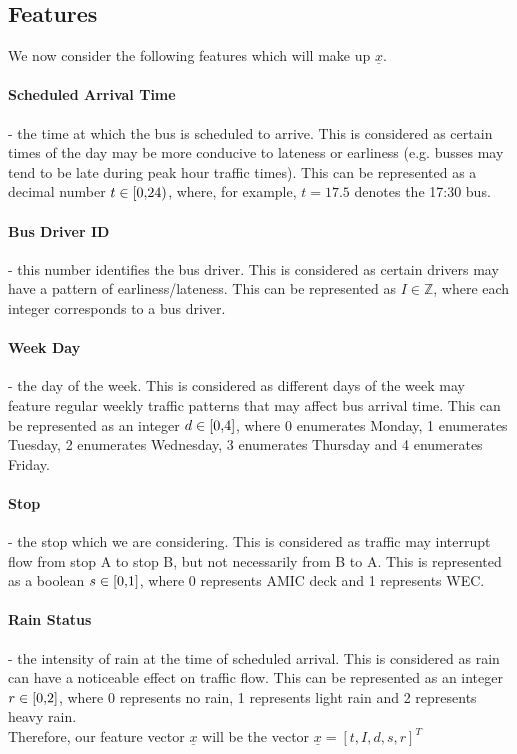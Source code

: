 \documentclass[11pt]{extarticle}
\begin{document}
\subsection{Features}
We now consider the following features which will make up $\underline{x}$.
\paragraph{Scheduled Arrival Time} - the time at which the bus is scheduled to arrive. This is considered as certain times of the day may be more conducive to lateness or earliness (e.g. busses may tend to be late during peak hour traffic times). This can be represented as a decimal number $t \in \interval[{0,24})$, where, for example, $t = 17.5$ denotes the 17:30 bus.
\paragraph{Bus Driver ID} - this number identifies the bus driver. This is considered as certain drivers may have a pattern of earliness/lateness. This can be represented as $I \in \mathbb{Z}$, where each integer corresponds to a bus driver.
\paragraph{Week Day} - the day of the week. This is considered as different days of the week may feature regular weekly traffic patterns that may affect bus arrival time. This can be represented as an integer $d \in \interval[{0,4}]$, where 0 enumerates Monday, 1 enumerates Tuesday, 2 enumerates Wednesday, 3 enumerates Thursday and 4 enumerates Friday.
\paragraph{Stop} - the stop which we are considering. This is considered as traffic may interrupt flow from stop A to stop B, but not necessarily from B to A. This is represented as a boolean $s \in \interval[{0,1}]$, where 0 represents AMIC deck and 1 represents WEC.
\paragraph{Rain Status} - the intensity of rain at the time of scheduled arrival. This is considered as rain can have a noticeable effect on traffic flow\cite{chung05}. This can be represented as an integer $r \in \interval[{0,2}]$, where 0 represents no rain, 1 represents light rain and 2 represents heavy rain.
\\[12pt]
Therefore, our feature vector $\underline{x}$ will be the vector $\underline{x} = [t,I,d,s,r]^{T}$
\end{document}

